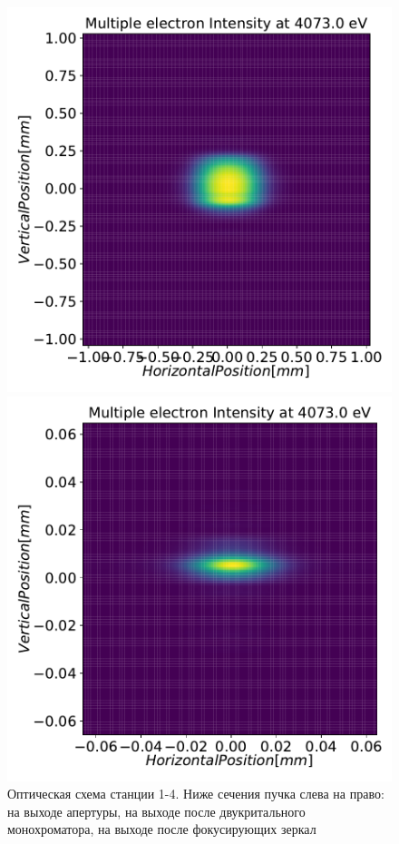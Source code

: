 \begin{figure}[h]
\begin{minipage}{0.3\textwidth}
		\includegraphics[width=\textwidth]{pic/3_harm_after_DCM_2d.pdf}
	\end{minipage} 
	\begin{minipage}{0.3\textwidth}
		\centering
		\includegraphics[width=\textwidth]{pic/3_harm_after_Sph_Mir_2d.pdf}
	\end{minipage} 
	\caption{Оптическая схема станции 1-4. Ниже сечения пучка слева на право: на выходе апертуры, на выходе после двукритального монохроматора, на выходе после фокусирующих зеркал}
	\label{fig:OptScheme_1-4}  
\end{figure}
